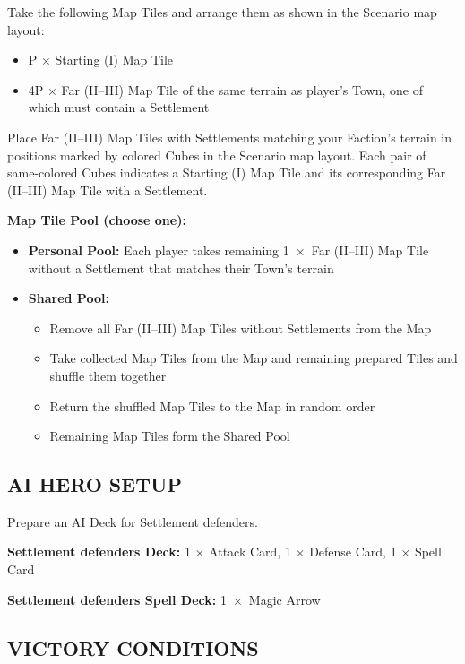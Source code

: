 \begin{multicols}{2}
Take the following Map Tiles and arrange them as shown in the Scenario map layout:

\begin{itemize}
  \item P × Starting (I) Map Tile
  \item 4P × Far (II--III) Map Tile of the same terrain as player's Town, one of which must contain a Settlement
\end{itemize}

Place Far (II--III) Map Tiles with Settlements matching your Faction's terrain in positions marked by colored Cubes in the Scenario map layout.
Each pair of same-colored Cubes indicates a Starting (I) Map Tile and its corresponding Far (II--III) Map Tile with a Settlement.

\textbf{Map Tile Pool (choose one):}

\begin{itemize}
  \item \textbf{Personal Pool:} Each player takes remaining 1~×~Far (II--III) Map Tile without a Settlement that matches their Town's terrain
  \item \textbf{Shared Pool:}
  \begin{itemize}
    \item Remove all Far (II--III) Map Tiles without Settlements from the Map
    \item Take collected Map Tiles from the Map and remaining prepared Tiles and shuffle them together
    \item Return the shuffled Map Tiles to the Map in random order
    \item Remaining Map Tiles form the Shared Pool
  \end{itemize}
\end{itemize}

\subsection*{\MakeUppercase{AI Hero Setup}}

Prepare an AI Deck for Settlement defenders.

\textbf{Settlement defenders Deck:} 1 × Attack Card, 1 × Defense Card, 1 × Spell Card

\textbf{Settlement defenders Spell Deck:} 1~×~Magic Arrow

\subsection*{\MakeUppercase{Victory Conditions}}


\end{multicols}
